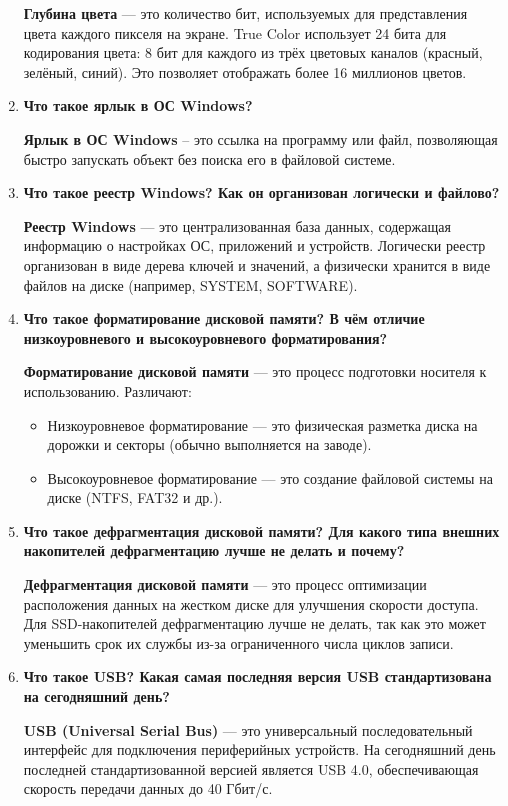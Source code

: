 \begin{enumerate}
		\textbf{Глубина цвета} --- это количество бит,
		используемых для представления цвета каждого пикселя на экране.
		True Color использует 24 бита для кодирования цвета:
		8 бит для каждого из трёх цветовых каналов (красный, зелёный, синий).
		Это позволяет отображать более 16 миллионов цветов.
	\item \textbf{Что такое ярлык в ОС Windows?}\par
		\textbf{Ярлык в ОС Windows} -- это ссылка на программу или файл,
		позволяющая быстро запускать объект без поиска его в файловой системе.
	\item \textbf{Что такое реестр Windows?
			Как он организован логически и файлово?}\par
		\textbf{Реестр Windows} --- это централизованная база данных,
		содержащая информацию о настройках ОС, приложений и устройств.
		Логически реестр организован в виде дерева ключей и значений,
		а физически хранится в виде файлов на диске
		(например, SYSTEM, SOFTWARE).
	\item \textbf{Что такое форматирование дисковой памяти?
			В чём отличие низкоуровневого
			и высокоуровневого форматирования?}\par
		\textbf{Форматирование дисковой памяти} --- это процесс подготовки
		носителя к использованию.
		Различают:
		\begin{itemize}
			\item Низкоуровневое форматирование --- это физическая разметка
				диска на дорожки и секторы (обычно выполняется на заводе).
			\item Высокоуровневое форматирование --- это создание файловой
				системы на диске (NTFS, FAT32 и др.).
		\end{itemize}
	\item \textbf{Что такое дефрагментация дисковой памяти?
			Для какого типа внешних накопителей дефрагментацию
			лучше не делать и почему?}\par
		\textbf{Дефрагментация дисковой памяти} --- это процесс оптимизации
		расположения данных на жестком диске для улучшения скорости доступа.
		Для SSD-накопителей дефрагментацию лучше не делать,
		так как это может уменьшить срок их службы
		из-за ограниченного числа циклов записи.
	\item \textbf{Что такое USB? Какая самая последняя версия
			USB стандартизована на сегодняшний день?}\par
		\textbf{USB (Universal Serial Bus)} --- это универсальный
		последовательный интерфейс для подключения периферийных устройств.
		На сегодняшний день последней стандартизованной версией является
		USB 4.0, обеспечивающая скорость передачи данных до 40 Гбит/с.
\end{enumerate}

